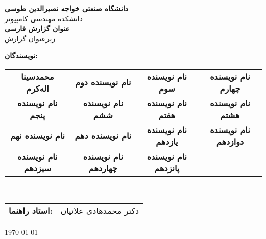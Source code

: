 \begin{titlepage}
    \centering
    
    \vspace*{2cm}
    
    {\Large \textbf{دانشگاه صنعتی خواجه نصیرالدین طوسی}}\\[0.5cm]
    {\large دانشکده مهندسی کامپیوتر}\\[1cm]
    
    {\Huge \textbf{عنوان گزارش فارسی}}\\[0.5cm]
    {\Large زیرعنوان گزارش}\\[1cm]
    
    {\large
        \textbf{نویسندگان:}\\[0.2cm]
        \begin{tabular}{cccc}
            \textbf{محمدسینا اله‌کرم} & \textbf{نام نویسنده دوم} &
            \textbf{نام نویسنده سوم} & \textbf{نام نویسنده چهارم} \\ 
            \textbf{نام نویسنده پنجم} & \textbf{نام نویسنده ششم} &
            \textbf{نام نویسنده هفتم} & \textbf{نام نویسنده هشتم} \\
            \textbf{نام نویسنده نهم} & \textbf{نام نویسنده دهم} &
            \textbf{نام نویسنده یازدهم} & \textbf{نام نویسنده دوازدهم} \\
            \textbf{نام نویسنده سیزدهم} & \textbf{نام نویسنده چهاردهم} &
            \textbf{نام نویسنده پانزدهم} \\
            
        \end{tabular}
        \\[1.5cm]
        \begin{tabular}{rl}
            \textbf{استاد راهنما:} & دکتر محمدهادی علائیان \\[0.3cm]
        \end{tabular}
    }
    
    \vfill
    
    {\large \today}
    
\end{titlepage}

\newpage


